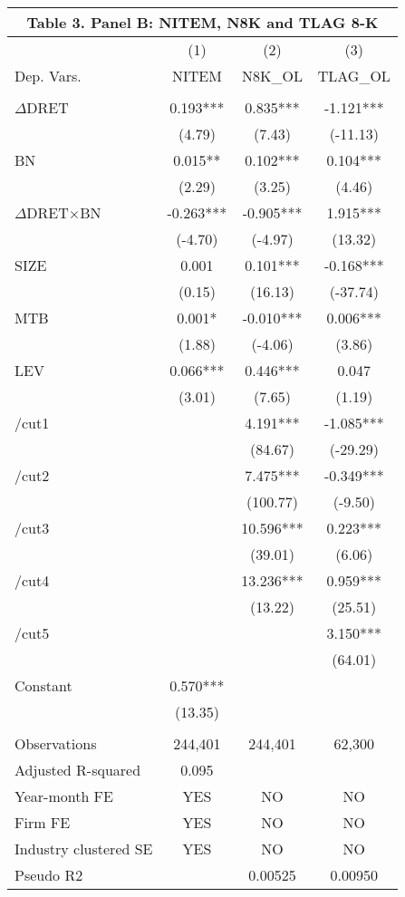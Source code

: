 \begin{table}[htbp] \label{T3PB}
  \centering
    \begin{tabular}{lccc}
    \multicolumn{4}{c}{\textbf{Table 3. Panel B: NITEM, N8K and TLAG 8-K}} \\
    \midrule
      & (1) & (2) & (3) \\
    Dep. Vars. & NITEM & N8K\_OL & TLAG\_OL \\
    \midrule
      &   &   &  \\
    $\Delta$DRET & 0.193*** & 0.835*** & -1.121*** \\
    & (4.79) & (7.43) & (-11.13) \\
    BN & 0.015** & 0.102*** & 0.104*** \\
    & (2.29) & (3.25) & (4.46) \\
    \rowcolor[rgb]{ .933,  .925,  .882} $\Delta$DRET$\times$BN & -0.263*** & -0.905*** & 1.915*** \\
    \rowcolor[rgb]{ .933,  .925,  .882}   & (-4.70) & (-4.97) & (13.32) \\
    SIZE & 0.001 & 0.101*** & -0.168*** \\
    & (0.15) & (16.13) & (-37.74) \\
    MTB & 0.001* & -0.010*** & 0.006*** \\
    & (1.88) & (-4.06) & (3.86) \\
    LEV & 0.066*** & 0.446*** & 0.047 \\
    & (3.01) & (7.65) & (1.19) \\
    /cut1 &   & 4.191*** & -1.085*** \\
    &   & (84.67) & (-29.29) \\
    /cut2 &   & 7.475*** & -0.349*** \\
    &   & (100.77) & (-9.50) \\
    /cut3 &   & 10.596*** & 0.223*** \\
    &   & (39.01) & (6.06) \\
    /cut4 &   & 13.236*** & 0.959*** \\
    &   & (13.22) & (25.51) \\
    /cut5 &   &   & 3.150*** \\
    &   &   & (64.01) \\
    Constant & 0.570*** &   &  \\
    & (13.35) &   &  \\
    &   &   &  \\
    Observations & 244,401 & 244,401 & 62,300 \\
    Adjusted R-squared & 0.095 &   &  \\
    Year-month FE & YES & NO & NO \\
    Firm FE & YES & NO & NO \\
    Industry clustered SE & YES & NO & NO \\
    Pseudo R2 &   & 0.00525 & 0.00950 \\
    \bottomrule
    \end{tabular}%
\end{table}%
